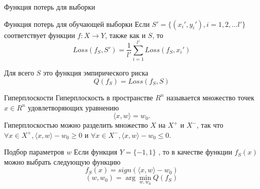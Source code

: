\documentclass{beamer}
\begin{document}
\begin{frame}{Функция потерь для выборки}
	\begin{block}{Функция потерь для обучающей выборки}
		Если $S' = \{(x_i', y_i'), i=1, 2, ... l'\}$ соответствует функции $f:X\to Y$, также как и $S$, то
		\begin{equation}
			Loss(f_S, S') = \frac{1}{l'}\sum_{i=1}^{l'} Loss(f_S, x_i')
		\end{equation}

		Для всего $S$ это функция эмпирического риска
		\begin{equation}
			Q(f_S) = Loss(f_S, S) 
		\end{equation}
	\end{block}
\end{frame}
\begin{frame}{Гиперплоскости}
	Гиперплоскость в пространстве $R^n$ называется множество точек $x \in R^n$ удовлетворяющих уравнению 
\begin{equation}
	\langle x, w \rangle = w_0.
\end{equation}
	Гиперплоскостью можно разделить множество $X$ на $X^+$ и $X^-$, так что $\forall x \in X^+ , \langle x, w \rangle - w_0 \geq 0$ и $\forall x \in X^-,  \langle x, w\rangle - w_0 \leq 0$. 
	\begin{block}{Подбор параметров $w$}
		Если функция $Y = \{-1, 1\}$ , то в качестве функции $f_S(x)$ можно выбрать следующую функцию
		\begin{equation}
                        f_S(x) = sign(\langle x, w\rangle - w_0)
		\end{equation}
		\begin{equation}
			(w, w_0) = \arg \min_{w, w_0} Q(f_S)
		\end{equation}
	\end{block}
\end{frame}
\begin{frame}
\end{frame}
\end{document}
